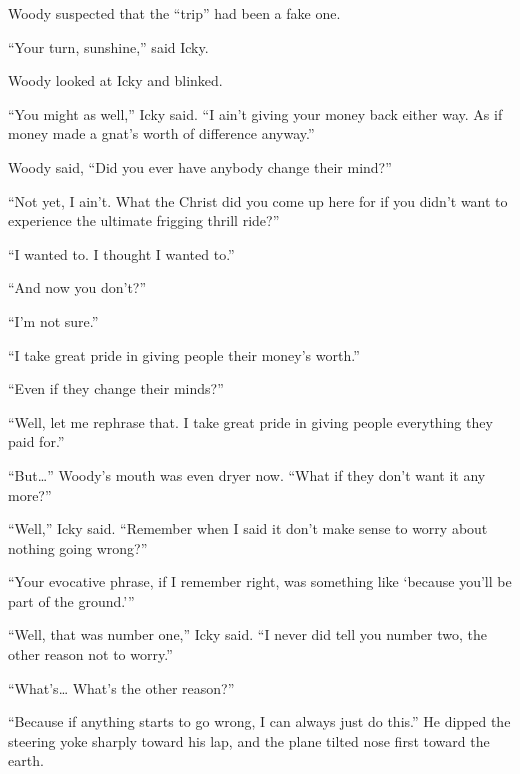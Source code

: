 Woody suspected that the ``trip'' had been a fake one.

``Your turn, sunshine,'' said Icky.

Woody looked at Icky and blinked.

``You might as well,'' Icky said. ``I ain't giving your money back either way. As if money made a gnat's worth of difference anyway.''

Woody said, ``Did you ever have anybody change their mind?''

``Not yet, I ain't. What the Christ did you come up here for if you didn't want to experience the ultimate frigging thrill ride?''

``I wanted to. I thought I wanted to.''

``And now you don't?''

``I'm not sure.''

``I take great pride in giving people their money's worth.''

``Even if they change their minds?''

``Well, let me rephrase that. I take great pride in giving people everything they paid for.''

``But…'' Woody's mouth was even dryer now. ``What if they don't want it any more?''

``Well,'' Icky said. ``Remember when I said it don't make sense to worry about nothing going wrong?''

``Your evocative phrase, if I remember right, was something like `because you'll be part of the ground.'\thinspace''

``Well, that was number one,'' Icky said. ``I never did tell you number two, the other reason not to worry.''

``What's… What's the other reason?''

``Because if anything starts to go wrong, I can always just do this.'' He dipped the steering yoke sharply toward his lap, and the plane tilted nose first toward the earth.

